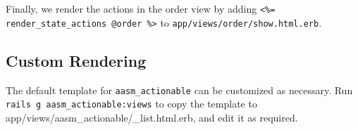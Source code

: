 \documentclass[document.tex]{subfiles}
\begin{document}
Finally, we render the actions in the order view by adding {\tt \textless{}\%= render\_state\_actions @order \%\textgreater{}} to {\tt app/views/order/show.html.erb}.

\subsection{Custom Rendering}

The default template for {\tt aasm\_actionable} can be customized as necessary. Run {\tt rails g aasm\_actionable:views} to copy the template to \\ app/views/aasm\_actionable/\_list.html.erb, and edit it as required.
\end{document}
